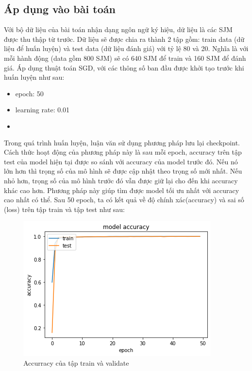 \subsection{Áp dụng vào bài toán}
Với bộ dữ liệu của bài toán nhận dạng ngôn ngữ ký hiệu, dữ liệu là các SJM được thu thập từ trước. Dữ liệu sẽ được chia ra thành 2 tập gồm: train data (dữ liệu để huấn luyện) và test data (dữ liệu đánh giá) với tỷ lệ 80 và 20. Nghĩa là với mỗi hành động (data gồm 800 SJM) sẽ có 640 SJM để train và 160 SJM để đánh giá.
Áp dụng thuật toán SGD, với các thông số ban đầu được khởi tạo trước khi huấn luyện như sau:
\begin{itemize}
\item epoch: 50
\item learning rate: 0.01
\item
\end{itemize}
Trong quá trình huấn luyện, luận văn sử dụng phương pháp lưu lại checkpoint. Cách thức hoạt động của phương pháp này là sau mỗi epoch, accuracy trên tập test của model hiện tại được so sánh với accuracy của model trước đó. Nếu nó lớn hơn thì trọng số của mô hình sẽ được cập nhật theo trọng số mới nhất. Nếu nhỏ hơn, trọng số của mô hình trước đó vẫn được giữ lại cho đến khi accuracy khác cao hơn. Phương pháp này giúp tìm được model tối ưu nhất với accuracy cao nhất có thể.
Sau 50 epoch, ta có kết quả về độ chính xác(accuracy) và sai số (loss) trên tập train và tập test như sau:
\FloatBarrier
\begin{figure}[htp]
\begin{center}
\includegraphics[scale=1]{chap4/c4_figs/train_val_acc.png}
\end{center}
\caption{Accurracy của tập train và validate}
\label{fig:pipelineS}
\end{figure}
\FloatBarrier

